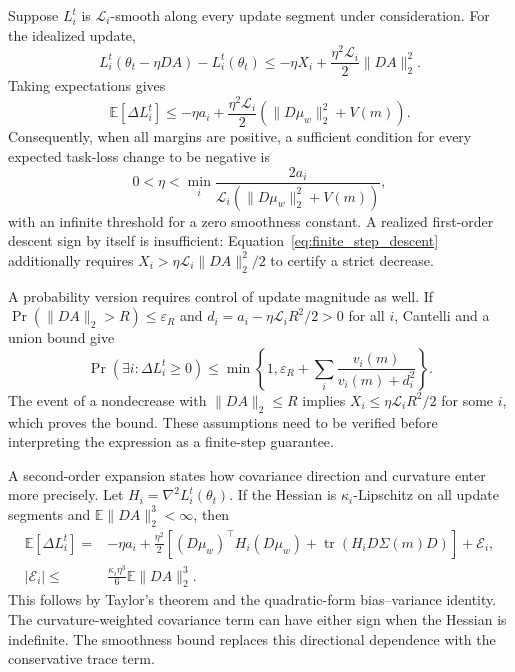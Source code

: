 Suppose $L_i^t$ is $\mathcal L_i$-smooth along every update segment
under consideration. For the idealized update,
\begin{equation}
    L_i^t(\theta_t-\eta DA)-L_i^t(\theta_t)
      \leq-\eta X_i+
         \frac{\eta^2\mathcal L_i}{2}\|DA\|_2^2.
    \label{eq:finite_step_descent}
\end{equation}
Taking expectations gives
\begin{equation}
    \mathbb E[\Delta L_i^t]
      \leq-\eta a_i+\frac{\eta^2\mathcal L_i}{2}
          \left(\|D\mu_w\|_2^2+V(m)\right).
    \label{eq:expected_task_descent}
\end{equation}
Consequently, when all margins are positive, a sufficient condition
for every expected task-loss change to be negative is
\begin{equation}
    0<\eta<\min_i
       \frac{2a_i}{\mathcal L_i(\|D\mu_w\|_2^2+V(m))},
\end{equation}
with an infinite threshold for a zero smoothness constant.
A realized first-order descent sign by itself is insufficient:
Equation~\ref{eq:finite_step_descent} additionally requires
$X_i>\eta\mathcal L_i\|DA\|_2^2/2$ to certify a strict decrease.

A probability version requires control of update magnitude as well.
If $\Pr(\|DA\|_2>R)\leq\varepsilon_R$ and
$d_i=a_i-\eta\mathcal L_iR^2/2>0$ for all $i$, Cantelli and a union
bound give
\begin{equation}
    \Pr(\exists i:\Delta L_i^t\geq0)
       \leq\min\left\{1,\varepsilon_R+
             \sum_i\frac{v_i(m)}{v_i(m)+d_i^2}\right\}.
\end{equation}
The event of a nondecrease with $\|DA\|_2\leq R$ implies
$X_i\leq\eta\mathcal L_iR^2/2$ for some $i$, which proves the bound.
These assumptions need to be verified before interpreting the expression
as a finite-step guarantee.

A second-order expansion states how covariance direction and curvature
enter more precisely. Let $H_i=\nabla^2L_i^t(\theta_t)$. If the Hessian
is $\kappa_i$-Lipschitz on all update segments and
$\mathbb E\|DA\|_2^3<\infty$, then
\begin{equation}
\begin{split}
    \mathbb E[\Delta L_i^t]
       ={}&-\eta a_i+\frac{\eta^2}{2}
          \left[(D\mu_w)^\top H_i(D\mu_w)
          +\operatorname{tr}(H_iD\Sigma(m)D)\right]+\mathcal E_i,\\
    |\mathcal E_i|\leq{}&\frac{\kappa_i\eta^3}{6}\mathbb E\|DA\|_2^3.
\end{split}
\end{equation}
This follows by Taylor's theorem and the quadratic-form
bias--variance identity. The curvature-weighted covariance term can
have either sign when the Hessian is indefinite. The smoothness bound
replaces this directional dependence with the conservative trace term.

